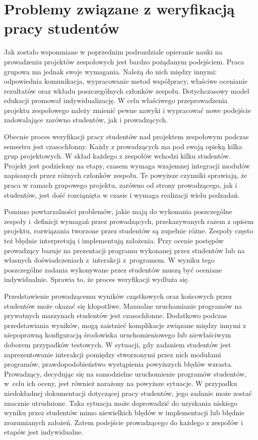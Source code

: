 \section{Problemy związane z weryfikacją pracy studentów}

Jak zostało wspomniane w poprzednim podrozdziale opieranie nauki na prowadzeniu projektów zespołowych jest bardzo pożądanym podejściem.
Praca grupowa ma jednak swoje wymagania.
Należą do nich między innymi: odpowiednia komunikacja, wypracowanie metod współpracy, właściwe ocenianie rezultatów oraz wkładu poszczególnych członków zespołu.
Dotychczasowy model edukacji promował indywidualizację.
W celu właściwego przeprowadzenia projektu zespołowego należy zmienić pewne nawyki i wypracować nowe podejście zadowalające zarówno studentów, jak i prowadzących.

Obecnie proces weryfikacji pracy studentów nad projektem zespołowym podczas semestru jest czasochłonny.
Każdy z prowadzących ma pod swoją opieką kilka grup projektowych.
W skład każdego z zespołów wchodzi kilku studentów.
Projekt jest podzielony na etapy, czasem wymaga wzajemnej integracji modułów napisanych przez różnych członków zespołu.
Te powyższe czynniki sprawiają, że praca w ramach grupowego projektu, zarówno od strony prowadzącego, jak i studentów, jest dość rozciąnięta w czasie i wymaga realizacji wielu podzadań.

Pomimo powtarzalności problemów, jakie mają do wykonania poszczególne zespoły i~definicji wymagań przez prowadzących, przekazywanych razem z opisem projektu, rozwiązania tworzone przez studentów są zupełnie różne.
Zespoły często też błędnie interpretują i implementują założenia.
Przy ocenie postępów prowadzący bazuje na prezentacji programu wykonanej przez studentów lub na własnych doświadczeniach z~interakcji z~programem.
W wyniku tego poszczególne zadania wykonywane przez studentów muszą być oceniane indywidualnie.
Sprawia to, że proces weryfikacji wydłuża się.

Przedstawienie prowadzącemu wyników cząstkowych oraz końcowych przez studentów może okazać się kłopotliwe.
Manualne uruchamianie programów na prywatnych maszynach studentów jest czasochłonne.
Dodatkowo podczas przedstawiania wyników, mogą zaistnieć komplikacje związane między innymi z niepoprawną konfiguracją środowiska uruchomieniowego lub niewłaściwym doborem przypadków testowych.
W sytuacji, gdy zadaniem studentów jest zaprezentowanie interakcji pomiędzy stworzonymi przez nich modułami programów, prawdopodobieństwo wystąpienia powyższych błędów wzrasta.
Prowadzący, decydując się na samodzielne uruchomienie programów studentów, w~celu ich oceny, jest również narażony na powyższe sytuacje.
W przypadku niedokładnej dokumentacji dotyczącej pracy studentów, jego zadanie może zostać znacznie utrudnione.
Taka sytuacja może doprowadzić do uzyskania niskiego wyniku przez studentów mimo niewielkich błędów w implementacji lub błędnie zrozumianych założeń.
Zatem podejście prowadzącego do każdego z zespołów i etapów jest indywidualne.

